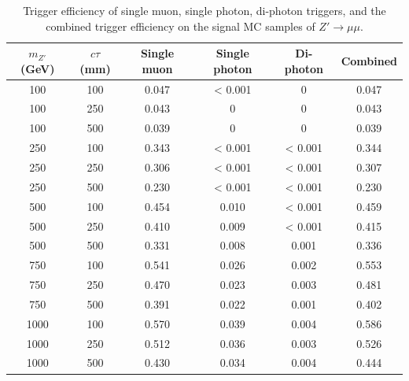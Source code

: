 \begin{table}[!htb]
  \centering
  \begin{tabular}{ c c | c c c c}
    \hline
    \hline
    $m_{Z'}$ (GeV) & $c\tau$ (mm) & Single muon & Single photon & Di-photon & Combined \\
    \hline
    100			&	100	& 0.047 	& < 0.001   &0  	    &0.047  		\\
    100			&	250	& 0.043  	&0  	 	&0  	    &0.043  		\\
    100			&	500	& 0.039 	&0  	 	&0  	    &0.039  		\\
    250			&	100	& 0.343  	&< 0.001 	&< 0.001    &0.344  		\\
    250			&	250	& 0.306  	&< 0.001 	&< 0.001    &0.307  		\\
    250			&	500	& 0.230 	&< 0.001 	&< 0.001    &0.230  		\\
    500			&	100	& 0.454 	&0.010   	&< 0.001    &0.459  		\\
    500			&	250	& 0.410 	&0.009   	&< 0.001    &0.415  		\\
    500			&	500	& 0.331  	&0.008   	&0.001      &0.336  		\\
    750			&	100	& 0.541 	&0.026   	&0.002      &0.553  		\\
    750			&	250	& 0.470 	&0.023   	&0.003      &0.481  		\\
    750			&	500	& 0.391 	&0.022 	    &0.001      &0.402  		\\
    1000	    &	100	& 0.570   	&0.039   	&0.004      &0.586  		\\
    1000	    &	250	& 0.512   	&0.036   	&0.003      &0.526  		\\
    1000	    &	500	& 0.430   	&0.034 	    &0.004      &0.444  		\\
    \hline
    \hline
  \end{tabular}
  \caption{Trigger efficiency of single muon, single photon, di-photon triggers, and the combined trigger efficiency on the signal MC samples of $Z'\rightarrow\mu\mu$.}
  \label{table:m_trig_eff_mumu}
\end{table}

